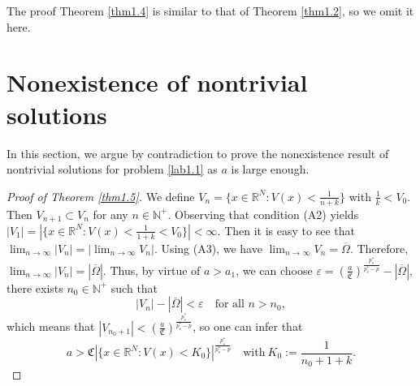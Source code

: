 \documentclass[reqno]{amsart}
\begin{document}
The  proof Theorem \ref{thm1.4} 
is similar to that of Theorem \ref{thm1.2}, so we omit it here.

\section{Nonexistence of nontrivial solutions}

In this section, we argue by contradiction to prove the nonexistence result of 
nontrivial solutions for problem \eqref{lab1.1} as $a$ is large enough.

\begin{proof}[Proof of Theorem \ref{thm1.5}] 
We define $V_n=\{x\in \mathbb{R}^N: V(x)<\frac{1}{n+k}\}$ with $\frac{1}{k}<V_0$. 
Then $V_{n+1}\subset V_n$ for any $n\in \mathbb{N}^+$. Observing that condition 
(A2) yields
$|V_1|=|\{x\in \mathbb{R}^N: V(x)<\frac{1}{1+k}<V_0\}|<\infty$.
Then it is easy to see that $\lim_{n\to \infty}|V_n|=|\lim_{n\to \infty}V_n|$. 
Using (A3), we have $\lim_{n\to \infty}V_n=\overline{\Omega}$. 
Therefore, $\lim_{n\to \infty}|V_n|=|\overline{\Omega}|$. Thus, by virtue of $a>a_1$,
 we can choose $\varepsilon=(\frac{a}{\mathfrak{C}})^{\frac{p_s^*}{p_s^*-p}}-|\overline{\Omega}|$, there exists $n_0\in \mathbb{N}^+$ such that
$$
|V_n|-|\overline{\Omega}|<\varepsilon\quad \text{for all } n>n_0,
$$
which means that $|V_{n_0+1}|<(\frac{a}{\mathfrak{C}})^{\frac{p_s^*}{p_s^*-p}}$, 
so one can infer that
\begin{equation}\label{lab5.1}
a>\mathfrak{C}|\{x\in \mathbb{R}^N: V(x)<K_0\}|^{\frac{p_s^*}{p_s^*-p}}\quad
 \text{with}\ K_0:=\frac{1}{n_0+1+k}.
\end{equation}


\end{proof}
\end{document}
